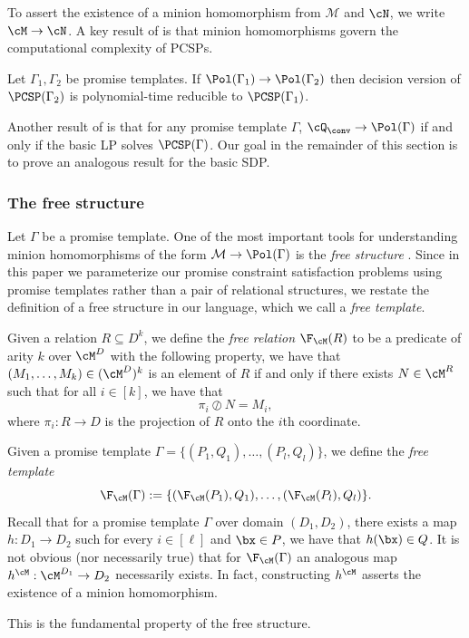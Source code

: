 {To assert the existence of a minion homomorphism from $\mathcal M$ and $\cN$, we write $\cM \to \cN$. A key result of \cite{BBKO21} is that minion homomorphisms govern the computational complexity of PCSPs.}

{\begin{theorem}
Let $\Gamma_1, \Gamma_2$ be promise templates. If $\Pol(\Gamma_1) \to \Pol(\Gamma_2)$ then decision version of $\PCSP(\Gamma_2)$ is polynomial-time reducible to $\PCSP(\Gamma_1)$.
\end{theorem}}

{Another result of \cite{BBKO21} is that for any promise template $\Gamma$, $\cQ_{\conv} \to \Pol(\Gamma)$ if and only if the basic LP solves $\PCSP(\Gamma)$. Our goal in the remainder of this section is to prove an analogous result for the basic SDP.} 

\subsubsection{The free structure}

{Let $\Gamma$ be a promise template.} One of the most important tools for understanding minion {homomorphisms of} the form $\mathcal M \to \Pol({\Gamma})$ {is} the \emph{free structure} \cite{BBKO21}. {Since in this paper we parameterize our promise constraint satisfaction problems using promise templates rather than a pair of relational structures, we restate the definition of a free structure in our language, which we call a \emph{free template}.}  {Given a relation $R \subseteq D^k$, we define the \emph{free relation} $\F_{\cM}(R)$ to be a predicate of arity $k$ over $\cM^D$ with the following property, we have that $(M_1, \hdots, M_k) \in (\cM^D)^k$ is an element of $R$ if and only if there exists $N \in \cM^{R}$ such that for all $i \in [k]$, we have that 
\[
    \pi_i \oslash N = M_i,
\]
where $\pi_i : R \to D$ is the projection of $R$ onto the $i$th coordinate.

Given a promise template $\Gamma = \{(P_1, Q_1), \hdots, (P_l, Q_l)\}$, we define the \emph{free template} 
\[
\F_{\cM}(\Gamma) := \{(\F_{\cM}(P_1), Q_1), \hdots, (\F_{\cM}(P_l), Q_l)\}.
\]
Recall that for a promise template $\Gamma$ over domain $(D_1, D_2)$, there exists a map $h : D_1 \to D_2$ such for every $i \in [\ell]$ and $\bx \in P$, we have that $h(\bx) \in Q$. It is not obvious (nor necessarily true) that for $\F_{\cM}(\Gamma)$ an analogous map $h^{\cM} : \cM^{D_1} \to D_2$ necessarily exists. In fact, constructing $h^{\cM}$ asserts the existence of a minion homomorphism. 
}
{This is t}he fundamental property of the free structure{.}

